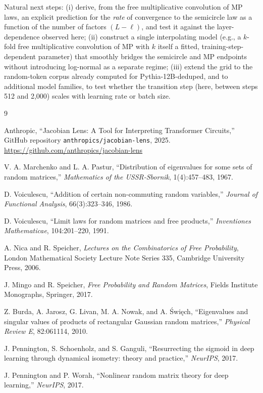 \documentclass[11pt,a4paper]{article}
\begin{document}
Natural next steps: (i) derive, from the free multiplicative convolution of MP laws, an explicit prediction for the \emph{rate} of convergence to the semicircle law as a function of the number of factors $(L-\ell)$, and test it against the layer-dependence observed here; (ii) construct a single interpolating model (e.g., a $k$-fold free multiplicative convolution of MP with $k$ itself a fitted, training-step-dependent parameter) that smoothly bridges the semicircle and MP endpoints without introducing log-normal as a separate regime; (iii) extend the grid to the random-token corpus already computed for Pythia-12B-deduped, and to additional model families, to test whether the transition step (here, between steps 512 and 2{,}000) scales with learning rate or batch size.

\begin{thebibliography}{9}

Anthropic, ``Jacobian Lens: A Tool for Interpreting Transformer Circuits,'' GitHub repository \texttt{anthropics/jacobian-lens}, 2025. \url{https://github.com/anthropics/jacobian-lens}

V. A. Marchenko and L. A. Pastur, ``Distribution of eigenvalues for some sets of random matrices,'' \emph{Mathematics of the USSR-Sbornik}, 1(4):457--483, 1967.

D. Voiculescu, ``Addition of certain non-commuting random variables,'' \emph{Journal of Functional Analysis}, 66(3):323--346, 1986.

D. Voiculescu, ``Limit laws for random matrices and free products,'' \emph{Inventiones Mathematicae}, 104:201--220, 1991.

A. Nica and R. Speicher, \emph{Lectures on the Combinatorics of Free Probability}, London Mathematical Society Lecture Note Series 335, Cambridge University Press, 2006.

J. Mingo and R. Speicher, \emph{Free Probability and Random Matrices}, Fields Institute Monographs, Springer, 2017.

Z. Burda, A. Jarosz, G. Livan, M. A. Nowak, and A. \'Swi\k{e}ch, ``Eigenvalues and singular values of products of rectangular Gaussian random matrices,'' \emph{Physical Review E}, 82:061114, 2010.

J. Pennington, S. Schoenholz, and S. Ganguli, ``Resurrecting the sigmoid in deep learning through dynamical isometry: theory and practice,'' \emph{NeurIPS}, 2017.

J. Pennington and P. Worah, ``Nonlinear random matrix theory for deep learning,'' \emph{NeurIPS}, 2017.

\end{thebibliography}
\end{document}
